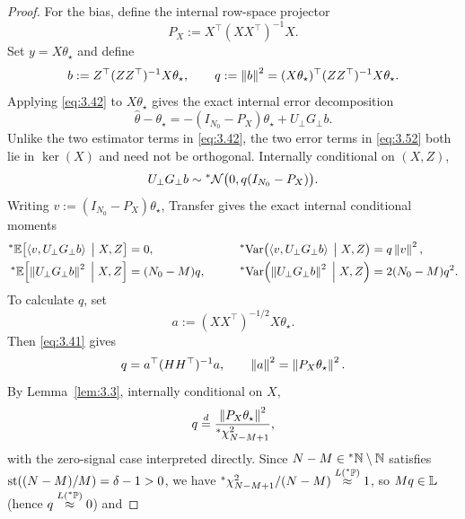 \begin{proof}
For the bias, define the internal row-space projector
\begin{equation}\label{eq:3.50}
P_X := X^\top (X X^\top)^{-1} X.
\end{equation}
Set $y = X\theta_\star$ and define
\begin{equation}\label{eq:3.51}
b := Z^\top (Z Z^\top)^{-1} X\theta_\star, \qquad q := \left\lVert b \right\rVert^2 = (X\theta_\star)^\top (Z Z^\top)^{-1} X\theta_\star.
\end{equation}
Applying \eqref{eq:3.42} to $X\theta_\star$ gives the exact internal error decomposition
\begin{equation}\label{eq:3.52}
\hat{\theta} - \theta_\star = -(I_{N_0} - P_X)\theta_\star + U_\perp G_\perp b.
\end{equation}
Unlike the two estimator terms in \eqref{eq:3.42}, the two error terms in \eqref{eq:3.52} both lie in $\ker(X)$ and need not be orthogonal. Internally conditional on $(X, Z)$,
\begin{equation}\label{eq:3.53}
U_\perp G_\perp b \sim {}^*\mathcal{N}\bigl(0, q(I_{N_0} - P_X)\bigr).
\end{equation}
Writing $v := (I_{N_0} - P_X)\theta_\star$, Transfer gives the exact internal conditional moments
\begin{equation}\label{eq:3.54}
\begin{aligned}
{}^*\mathbb{E}\bigl[\left\langle v, U_\perp G_\perp b \right\rangle \;\big|\; X, Z\bigr] &= 0, \qquad &{}^*\!\operatorname{Var}\bigl(\left\langle v, U_\perp G_\perp b \right\rangle \;\big|\; X, Z\bigr) &= q\left\lVert v \right\rVert^2, \\
{}^*\mathbb{E}\Bigl[\left\lVert U_\perp G_\perp b \right\rVert^2 \;\Big|\; X, Z\Bigr] &= (N_0 - M)q, \qquad &{}^*\!\operatorname{Var}\Bigl(\left\lVert U_\perp G_\perp b \right\rVert^2 \;\Big|\; X, Z\Bigr) &= 2(N_0 - M)q^2.
\end{aligned}
\end{equation}
To calculate $q$, set
\begin{equation}\label{eq:3.55}
a := (X X^\top)^{-1/2} X\theta_\star.
\end{equation}
Then \eqref{eq:3.41} gives
\begin{equation}\label{eq:3.56}
q = a^\top (H H^\top)^{-1} a, \qquad \left\lVert a \right\rVert^2 = \left\lVert P_X\theta_\star \right\rVert^2.
\end{equation}
By Lemma~\ref{lem:3.3}, internally conditional on $X$,
\begin{equation}\label{eq:3.57}
q \stackrel{d}{=} \frac{\left\lVert P_X\theta_\star \right\rVert^2}{{}^*\chi^2_{N - M + 1}},
\end{equation}
with the zero-signal case interpreted directly. Since $N - M \in {}^*\mathbb{N} \setminus \mathbb{N}$ satisfies $\operatorname{st}((N - M)/M) = \delta - 1 > 0$, we have ${}^*\chi^2_{N - M + 1} / (N - M) \stackrel{L({}^*\mathbb{P})}{\approx} 1$, so $M q \in \mathbb{L}$ (hence $q \stackrel{L({}^*\mathbb{P})}{\approx} 0$) and

\end{proof}
